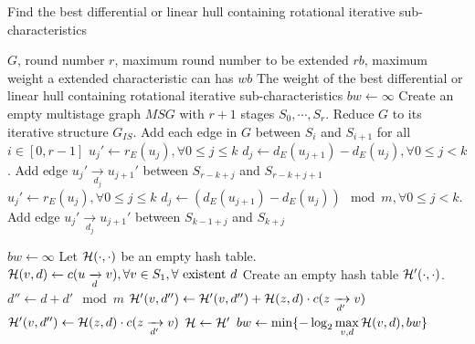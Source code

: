 \begin{algorithm}[htbp]
	\caption{Find the best differential or linear hull containing rotational iterative sub-characteristics}
	\label{algo:msg-equiv}
	\begin{algorithmic}[1]
        \Require $G$, round number $r$, maximum round number to be extended $rb$, maximum weight a extended characteristic can has $wb$
        \Ensure The weight of the best differential or linear hull containing rotational iterative sub-characteristics
        \Procedure {}{}
        \State $bw\leftarrow\infty$
        \State Create an empty multistage graph $MSG$ with $r+1$ stages $S_0,\cdots,S_r$.
        \State Reduce $G$ to its iterative structure $G_{IS}$. 
        \State Add each edge in $G$ between $S_i$ and $S_{i+1}$ for all $i\in[0,r-1]$
        \State $u_j'\leftarrow r_E(u_j),\forall 0\leq j\leq k$
        \State $d_j\leftarrow d_E(u_{j+1})-d_E(u_j),\forall 0\leq j<k$.
        \State Add edge $u_j'\xrightarrow[d_j]{} u_{j+1}'$ between $S_{r-k+j}$ and $S_{r-k+j+1}$
        \EndFor
        \State $u_j'\leftarrow r_E(u_j),\forall 0\leq j\leq k$
        \State $d_j\leftarrow (d_E(u_{j+1})-d_E(u_j))\mod m,\forall 0\leq j<k$.
        \State Add edge $u_j'\xrightarrow[d_j]{} u_{j+1}'$ between $S_{k-1+j}$ and $S_{k+j}$
        \EndFor

        \State $bw\leftarrow\infty$
        \State Let $\mathcal{H}(\cdot,\cdot)$ be an empty hash table. 
        \State $\mathcal{H}(v,d)\leftarrow c(u\xrightarrow[d]{} v),\forall v\in S_1,\forall \text{ existent } d$
        \State Create an empty hash table $\mathcal{H}'(\cdot,\cdot)$.
        \State $d''\leftarrow d+d'\mod m$
        \State $\mathcal{H}'(v,d'')\leftarrow\mathcal{H}'(v,d'')+\mathcal{H}(z,d)\cdot c(z\xrightarrow[d']{} v)$
        \Else
        \State $\mathcal{H}'(v,d'')\leftarrow\mathcal{H}(z,d)\cdot c(z\xrightarrow[d']{} v)$
        \EndIf
        \EndFor
        \State $\mathcal{H}\leftarrow \mathcal{H}'$
        \EndFor
        \State $bw\leftarrow\min\{-\log_2\max\limits_{v,d}\mathcal{H}(v,d),bw\}$
        \EndFor

        \State {}
        \EndProcedure
	\end{algorithmic}
\end{algorithm}